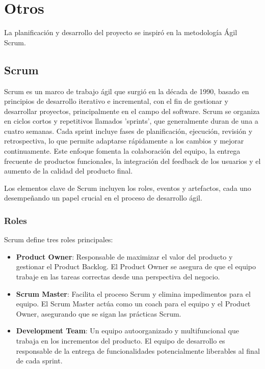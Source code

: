 \documentclass[a4paper, 12pt]{book}
\begin{document}

\cleardoublepage

\section{Otros}

La planificación y desarrollo del proyecto se inspiró en la metodología Ágil Scrum.

\subsection{Scrum}
Scrum es un marco de trabajo ágil que surgió en la década de 1990, basado en principios de desarrollo iterativo e incremental, con el fin de gestionar y desarrollar proyectos, principalmente en el campo del software. Scrum se organiza en ciclos cortos y repetitivos llamados 'sprints', que generalmente duran de una a cuatro semanas. Cada sprint incluye fases de planificación, ejecución, revisión y retrospectiva, lo que permite adaptarse rápidamente a los cambios y mejorar continuamente. Este enfoque fomenta la colaboración del equipo, la entrega frecuente de productos funcionales, la integración del feedback de los usuarios y el aumento de la calidad del producto final.


Los elementos clave de Scrum incluyen los roles, eventos y artefactos, cada uno desempeñando un papel crucial en el proceso de desarrollo ágil.

\subsubsection{Roles}
Scrum define tres roles principales:

\begin{itemize}
    \item \textbf{Product Owner}: Responsable de maximizar el valor del producto y gestionar el Product Backlog. El Product Owner se asegura de que el equipo trabaje en las tareas correctas desde una perspectiva del negocio.
    \item \textbf{Scrum Master}: Facilita el proceso Scrum y elimina impedimentos para el equipo. El Scrum Master actúa como un coach para el equipo y el Product Owner, asegurando que se sigan las prácticas Scrum.
    \item \textbf{Development Team}: Un equipo autoorganizado y multifuncional que trabaja en los incrementos del producto. El equipo de desarrollo es responsable de la entrega de funcionalidades potencialmente liberables al final de cada sprint.
\end{itemize}
\end{document}
